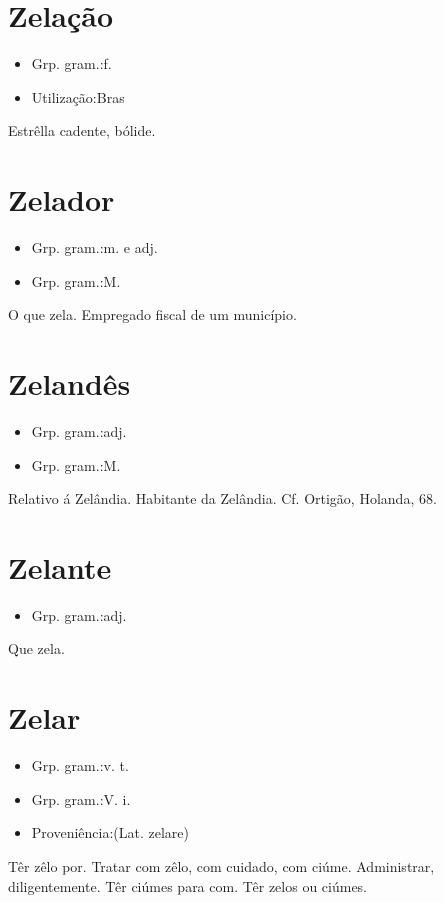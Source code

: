 \section{Zelação}
\begin{itemize}
\item {Grp. gram.:f.}
\end{itemize}
\begin{itemize}
\item {Utilização:Bras}
\end{itemize}
Estrêlla cadente, bólide.
\section{Zelador}
\begin{itemize}
\item {Grp. gram.:m.  e  adj.}
\end{itemize}
\begin{itemize}
\item {Grp. gram.:M.}
\end{itemize}
O que zela.
Empregado fiscal de um município.
\section{Zelandês}
\begin{itemize}
\item {Grp. gram.:adj.}
\end{itemize}
\begin{itemize}
\item {Grp. gram.:M.}
\end{itemize}
Relativo á Zelândia.
Habitante da Zelândia. Cf. Ortigão, \textunderscore Holanda\textunderscore , 68.
\section{Zelante}
\begin{itemize}
\item {Grp. gram.:adj.}
\end{itemize}
Que zela.
\section{Zelar}
\begin{itemize}
\item {Grp. gram.:v. t.}
\end{itemize}
\begin{itemize}
\item {Grp. gram.:V. i.}
\end{itemize}
\begin{itemize}
\item {Proveniência:(Lat. \textunderscore zelare\textunderscore )}
\end{itemize}
Têr zêlo por.
Tratar com zêlo, com cuidado, com ciúme.
Administrar, diligentemente.
Têr ciúmes para com.
Têr zelos ou ciúmes.
